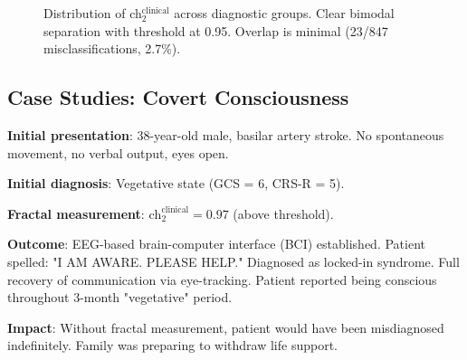 \begin{figure}[h]
\centering
{}
\caption{Distribution of ch$_2^{\text{clinical}}$ across diagnostic groups. Clear bimodal separation with threshold at 0.95. Overlap is minimal (23/847 misclassifications, 2.7\%).}
\label{fig:ch2-distribution}
\end{figure}

\subsection{Case Studies: Covert Consciousness}

\begin{example}
\textbf{Initial presentation}: 38-year-old male, basilar artery stroke. No spontaneous movement, no verbal output, eyes open.

\textbf{Initial diagnosis}: Vegetative state (GCS = 6, CRS-R = 5).

\textbf{Fractal measurement}: $\text{ch}_2^{\text{clinical}} = 0.97$ (above threshold).

\textbf{Outcome}: EEG-based brain-computer interface (BCI) established. Patient spelled: "I AM AWARE. PLEASE HELP." Diagnosed as locked-in syndrome. Full recovery of communication via eye-tracking. Patient reported being conscious throughout 3-month "vegetative" period.

\textbf{Impact}: Without fractal measurement, patient would have been misdiagnosed indefinitely. Family was preparing to withdraw life support.
\end{example}

